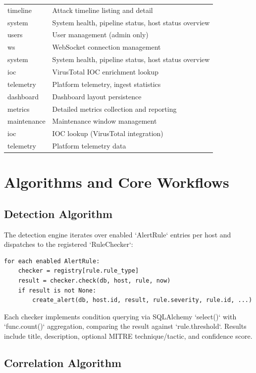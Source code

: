 \begin{longtable}{|l|l|}
timeline & Attack timeline listing and detail \\
system & System health, pipeline status, host status overview \\
users & User management (admin only) \\
ws & WebSocket connection management \\
system & System health, pipeline status, host status overview \\
ioc & VirusTotal IOC enrichment lookup \\
telemetry & Platform telemetry, ingest statistics \\
dashboard & Dashboard layout persistence \\
metrics & Detailed metrics collection and reporting \\
maintenance & Maintenance window management \\
ioc & IOC lookup (VirusTotal integration) \\
telemetry & Platform telemetry data \\
\hline
\end{longtable}

\section{Algorithms and Core Workflows}

\subsection{Detection Algorithm}

The detection engine iterates over enabled `AlertRule` entries per host and dispatches to the registered `RuleChecker`:

\begin{verbatim}
for each enabled AlertRule:
    checker = registry[rule.rule_type]
    result = checker.check(db, host, rule, now)
    if result is not None:
        create_alert(db, host.id, result, rule.severity, rule.id, ...)
\end{verbatim}

Each checker implements condition querying via SQLAlchemy `select()` with `func.count()` aggregation, comparing the result against `rule.threshold`. Results include title, description, optional MITRE technique/tactic, and confidence score.

\subsection{Correlation Algorithm}

